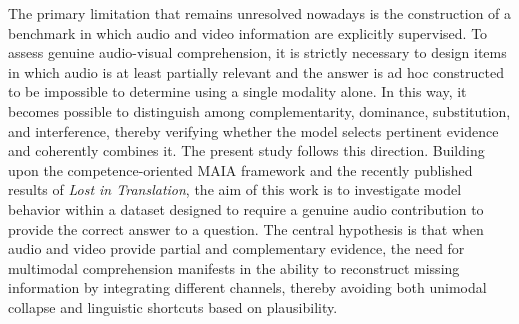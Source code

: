 The primary limitation that remains unresolved nowadays is the construction of a benchmark in which audio and video information are explicitly supervised. To assess genuine audio-visual comprehension, it is strictly necessary to design items in which audio is at least partially relevant and the answer is ad hoc constructed to be impossible to determine using a single modality alone. In this way, it becomes possible to distinguish among complementarity, dominance, substitution, and interference, thereby verifying whether the model selects pertinent evidence and coherently combines it.
The present study follows this direction. Building upon the competence-oriented MAIA framework and the recently published results of \textit{Lost in Translation}, the aim of this work is to investigate model behavior within a dataset designed to require a genuine audio contribution to provide the correct answer to a question.
The central hypothesis is that when audio and video provide partial and complementary evidence, the need for multimodal comprehension manifests in the ability to reconstruct missing information by integrating different channels, thereby avoiding both unimodal collapse and linguistic shortcuts based on plausibility.